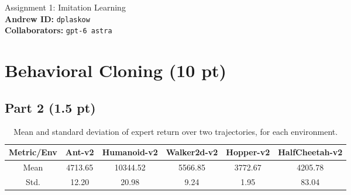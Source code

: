\documentclass{article}
\begin{document}
\begin{center}
    {\Large Assignment 1: Imitation Learning} \\
    \vspace{.25cm}
    \textbf{Andrew ID:} \texttt{dplaskow} \\
    \textbf{Collaborators:} \texttt{gpt-6 astra}
\end{center}


\section{Behavioral Cloning (10 pt)}

\subsection{Part 2 (1.5 pt)}

\begin{table}[!h]
  \centering
  \caption{Mean and standard deviation of expert return over two trajectories, for each environment.}
  \begin{tabular}{cccccc}
    \toprule
    Metric/Env & Ant-v2 & Humanoid-v2 & Walker2d-v2 & Hopper-v2 & HalfCheetah-v2 \\
    \midrule
    Mean  & 4713.65 & 10344.52 & 5566.85 & 3772.67 & 4205.78 \\
    Std.  & 12.20 & 20.98 & 9.24 & 1.95 & 83.04 \\
    \bottomrule
  \end{tabular}
  \label{tab:p2}
\end{table}
\end{document}
